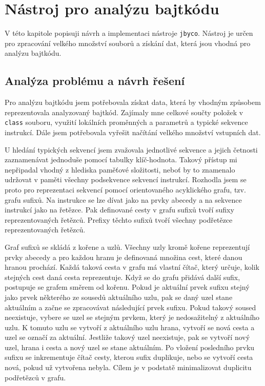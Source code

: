 \chapter{Nástroj pro analýzu bajtkódu}\label{Tool}

V této kapitole popisuji návrh a implementaci nástroje \texttt{jbyco}. Nástroj je určen pro zpracování velkého množství souborů a získání dat, která jsou vhodná pro analýzu bajtkódu.

\section{Analýza problému a návrh řešení}\label{ToolDesign}

Pro analýzu bajtkódu jsem potřebovala získat data, která by vhodným způsobem reprezentovala analyzovaný bajtkód. Zajímaly mne celkové součty položek v \texttt{class} souboru, využití lokálních proměnných a parametrů a typické sekvence instrukcí. Dále jsem potřebovala vyřešit načítání velkého množství vstupních dat.

U hledání typických sekvencí jsem zvažovala jednotlivé sekvence a jejich četnosti zaznamenávat jednoduše pomocí tabulky klíč-hodnota. Takový přístup mi nepřipadal vhodný z hlediska paměťové složitosti, neboť by to znamenalo udržovat v paměti všechny podsekvence sekvencí instrukcí. Rozhodla jsem se proto pro reprezentaci sekvencí pomocí orientovaného acyklického grafu, tzv. grafu sufixů. Na instrukce se lze dívat jako na prvky abecedy a na sekvence instrukcí jako na řetězce. Pak definované cesty v grafu sufixů tvoří sufixy reprezentovaných řetězců. Prefixy těchto sufixů tvoří všechny podřetězce reprezentovaných řetězců. 

Graf sufixů se skládá z kořene a uzlů. Všechny uzly kromě kořene reprezentují prvky abecedy a pro každou hranu je definovaná množina cest, které danou hranou prochází. Každá taková cesta v grafu má vlastní čítač, který určuje, kolik stejných cest daná cesta reprezentuje. Když se do grafu přidává další sufix, postupuje se grafem směrem od kořenu. Pokud je aktuální prvek sufixu stejný jako prvek některého ze sousedů aktuálního uzlu, pak se daný uzel stane aktuálním a začne se zpracovávat následující prvek sufixu. Pokud takový soused neexistuje, vybere se uzel se stejným prvkem, který je nedosažitelný z aktuálního uzlu. K tomuto uzlu se vytvoří z aktuálního uzlu hrana, vytvoří se nová cesta a uzel se označí za aktuální. Jestliže takový uzel neexistuje, pak se vytvoří nový uzel, hrana i cesta a nový uzel se stane aktuálním. Po vložení posledního prvku sufixu se inkrementuje čítač cesty, kterou sufix duplikuje, nebo se vytvoří cesta nová, pokud už vytvořena nebyla. Cílem je v podstatě minimalizovat duplicitu podřetězců v grafu.

